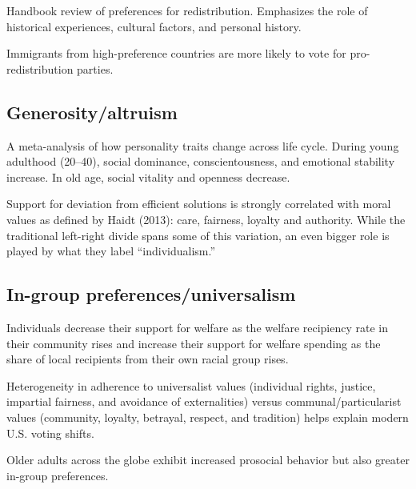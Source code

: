 \documentclass{article}
\newcommand{\citem}[1]{\medskip \noindent \textbf{\cite*{#1}}}
\begin{document}
\citem{alesina2011preferences}

Handbook review of preferences for redistribution. Emphasizes the role of historical experiences, cultural factors, and personal history.

\citem{luttmer2011culture}

Immigrants from high-preference countries are more likely to vote for pro-redistribution parties.

\subsection{Generosity/altruism}

\citem{roberts2006patterns}

A meta-analysis of how personality traits change across life cycle. During young adulthood (20--40), social dominance, conscientousness, and emotional stability increase. In old age, social vitality and openness decrease.

\citem{landier2022neoliberal}

Support for deviation from efficient solutions is strongly correlated with moral values as defined by Haidt (2013): care, fairness, loyalty and authority. While the traditional left-right divide spans some of this variation, an even bigger role is played by what they label ``individualism.''

\subsection{In-group preferences/universalism}

\citem{luttmer2001group}

Individuals decrease their support for welfare as the welfare recipiency
rate in their community rises and increase their support for welfare spending as the share of local recipients from their own racial group rises.

\citem{enke2020moral, enke2023moral}

Heterogeneity in adherence to universalist values (individual rights, justice, impartial fairness, and avoidance of externalities) versus communal/particularist values (community, loyalty, betrayal, respect, and tradition) helps explain modern U.S. voting shifts.



\citem{cutler2021older}

Older adults across the globe exhibit increased prosocial behavior but also greater in-group preferences.
\end{document}
